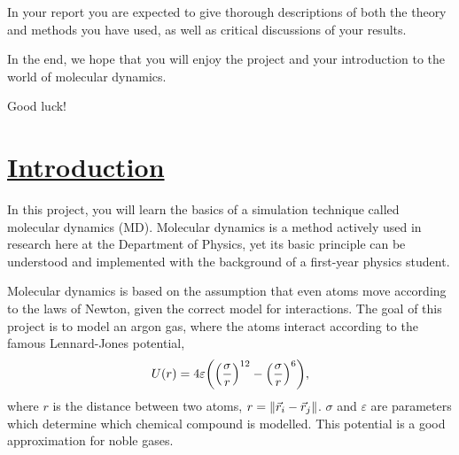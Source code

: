 \documentclass[11pt,british,a4paper]{report}
\begin{document}
In your report you are expected to give thorough descriptions of both the theory and methods you have used, as well as critical discussions of your results.

In the end, we hope that you will enjoy the project and your introduction to the world of molecular dynamics. 

Good luck!


\clearpage

\section{\underline{Introduction}}
In this project, you will learn the basics of a simulation technique called molecular dynamics (MD). Molecular dynamics is a method actively used in research here at the Department of Physics, yet its basic principle can be understood and implemented with the background of a first-year physics student.

Molecular dynamics is based on the assumption that even atoms move according to the laws of Newton, given the correct model for interactions. The goal of this project is to model an argon gas, where the atoms interact according to the famous Lennard-Jones potential,
\begin{equation}
    U(r) = 4\varepsilon\qty(\qty(\frac{\sigma}{r})^{12} - \qty(\frac{\sigma}{r})^6), \label{eq:lj}
\end{equation}
where \(r\) is the distance between two atoms, \(r=\norm{\vec{r}_i-\vec{r}_j}\). \(\sigma\) and \(\varepsilon\) are parameters which determine which chemical compound is modelled. This potential is a good approximation for noble gases.
\end{document}
